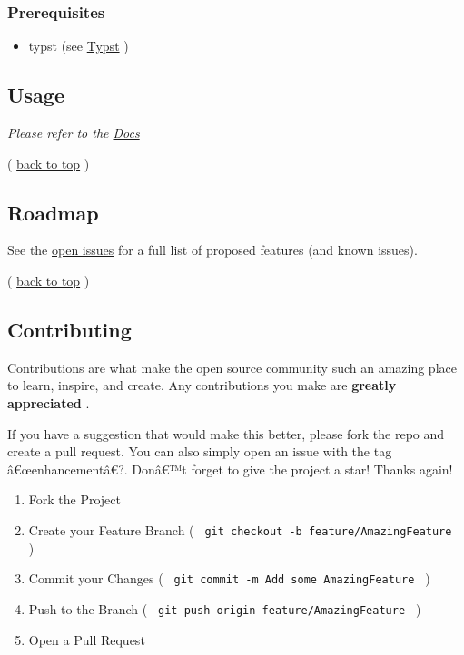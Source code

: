 \subsubsection{Prerequisites}\label{prerequisites}

\begin{itemize}
\tightlist
\item
  typst (see \href{https://typst.app/}{Typst} )
\end{itemize}

\subsection{Usage}\label{usage}

\emph{Please refer to the
\href{https://github.com/typst/packages/raw/main/packages/preview/cvssc/0.1.0/cvssc/0.1.0/src/docs.pdf}{Docs}}

(
\href{https://github.com/typst/packages/raw/main/packages/preview/cvssc/0.1.0/\#readme-top}{back
to top} )

\subsection{Roadmap}\label{roadmap}

See the \href{https://github.com/DrakeAxelrod/cvssc/issues}{open issues}
for a full list of proposed features (and known issues).

(
\href{https://github.com/typst/packages/raw/main/packages/preview/cvssc/0.1.0/\#readme-top}{back
to top} )

\subsection{Contributing}\label{contributing}

Contributions are what make the open source community such an amazing
place to learn, inspire, and create. Any contributions you make are
\textbf{greatly appreciated} .

If you have a suggestion that would make this better, please fork the
repo and create a pull request. You can also simply open an issue with
the tag â€œenhancementâ€?. Donâ€™t forget to give the project a star!
Thanks again!

\begin{enumerate}
\tightlist
\item
  Fork the Project
\item
  Create your Feature Branch (
  \texttt{\ git\ checkout\ -b\ feature/AmazingFeature\ } )
\item
  Commit your Changes (
  \texttt{\ git\ commit\ -m\ \textquotesingle{}Add\ some\ AmazingFeature\textquotesingle{}\ }
  )
\item
  Push to the Branch (
  \texttt{\ git\ push\ origin\ feature/AmazingFeature\ } )
\item
  Open a Pull Request
\end{enumerate}

